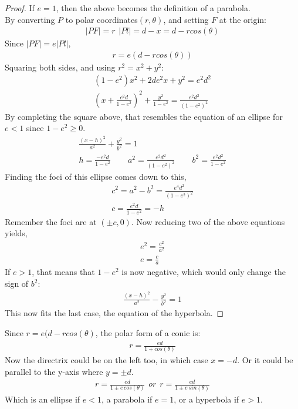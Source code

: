 \documentclass{article}
\begin{document}
\begin{proof}
If $e = 1$, then the above becomes the definition of a parabola.
\\By converting $P$ to polar coordinates$(r,\theta)$, and setting $F$ at the origin:
\begin{gather*}
    |PF| = r \hspace{5pt} |Pl| = d - x = d - r cos(\theta)
\end{gather*}
Since $|PF| = e|Pl|$,
\begin{gather*}
    r = e(d - r cos(\theta))
\end{gather*}
Squaring both sides, and using $r^2 = x^2 + y^2$:
\begin{gather*}
    (1-e^2)x^2 + 2de^2x + y^2 = e^2d^2\\
    (x+\frac{e^2d}{1-e^2})^2 + \frac{y^2}{1-e^2} = \frac{e^2d^2}{(1-e^2)^2}
\end{gather*}
By completing the square above, that resembles the equation of an ellipse for $e < 1$ since $1-e^2 \geqslant 0$.
\begin{gather*}
    \frac{(x-h)^2}{a^2} + \frac{y^2}{b^2} = 1\\
    h = \frac{-e^2d}{1-e^2}\hspace{25pt}a^2 = \frac{e^2d^2}{(1-e^2)^2}\hspace{25pt}b^2 = \frac{e^2d^2}{1-e^2}
\end{gather*}
Finding the foci of this ellipse comes down to this,
\begin{gather*}
    c^2 = a^2 - b^2 = \frac{e^4d^2}{(1-e^2)^2}\\
    c = \frac{e^2d}{1-e^2} = -h
\end{gather*}
Remember the foci are at $(\pm c, 0)$. Now reducing two of the above equations yields,
\begin{gather*}
    e^2 = \frac{c^2}{a^2}\\
    e = \frac{c}{a}
\end{gather*}
If $e > 1$, that means that $1-e^2$ is now negative, which would only change the sign of $b^2$:
\begin{gather*}
    \frac{(x-h)^2}{a^2} - \frac{y^2}{b^2} = 1
\end{gather*}
This now fits the last case, the equation of the hyperbola.
\end{proof}
Since $r = e(d-rcos(\theta)$, the polar form of a conic is:
\begin{gather*}
    r = \frac{ed}{1 + cos(\theta)}
\end{gather*}
Now the directrix could be on the left too, in which case $x = -d$. Or it could be parallel to the y-axis where $y = \pm d$.
\begin{gather*}
    r = \frac{ed}{1 \pm e\hspace{2pt} cos(\theta)} \hspace{5pt}or \hspace{5pt}r = \frac{ed}{1 \pm e\hspace{2pt} sin(\theta)}
\end{gather*}
Which is an ellipse if $e < 1$, a parabola if $e = 1$, or a hyperbola if $e > 1$.
\end{document}
